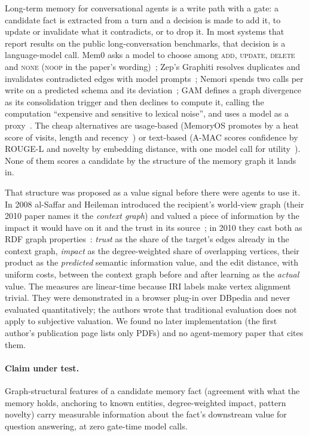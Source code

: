 \documentclass{ceurart}
\begin{document}
Long-term memory for conversational agents is a write path with a gate: a candidate fact is extracted from a turn and a decision is made to add it, to update or invalidate what it contradicts, or to drop it. In most systems that report results on the public long-conversation benchmarks, that decision is a language-model call. Mem0 asks a model to choose among \textsc{add}, \textsc{update}, \textsc{delete} and \textsc{none} (\textsc{noop} in the paper's wording)~\cite{chhikara2025mem0}; Zep's Graphiti resolves duplicates and invalidates contradicted edges with model prompts~\cite{rasmussen2025zep,graphiti}; Nemori spends two calls per write on a predicted schema and its deviation~\cite{nemori2025}; GAM defines a graph divergence as its consolidation trigger and then declines to compute it, calling the computation ``expensive and sensitive to lexical noise'', and uses a model as a proxy~\cite{gam2026}. The cheap alternatives are usage-based (MemoryOS promotes by a heat score of visits, length and recency~\cite{kang2025memoryos}) or text-based (A-MAC scores confidence by ROUGE-L and novelty by embedding distance, with one model call for utility~\cite{zhang2026amac}). None of them scores a candidate by the structure of the memory graph it lands in.

That structure was proposed as a value signal before there were agents to use it. In 2008 al-Saffar and Heileman introduced the recipient's world-view graph (their 2010 paper names it the \emph{context graph}) and valued a piece of information by the impact it would have on it and the trust in its source~\cite{alsaffar2008impact,alsaffar2008valuation}; in 2010 they cast both as RDF graph properties~\cite{alsaffar2010siv}: \emph{trust} as the share of the target's edges already in the context graph, \emph{impact} as the degree-weighted share of overlapping vertices, their product as the \emph{predicted} semantic information value, and the edit distance, with uniform costs, between the context graph before and after learning as the \emph{actual} value. The measures are linear-time because IRI labels make vertex alignment trivial. They were demonstrated in a browser plug-in over DBpedia and never evaluated quantitatively; the authors wrote that traditional evaluation does not apply to subjective valuation. We found no later implementation (the first author's publication page lists only PDFs) and no agent-memory paper that cites them.

\paragraph{Claim under test.} Graph-structural features of a candidate memory fact (agreement with what the memory holds, anchoring to known entities, degree-weighted impact, pattern novelty) carry measurable information about the fact's downstream value for question answering, at zero gate-time model calls.
\end{document}
